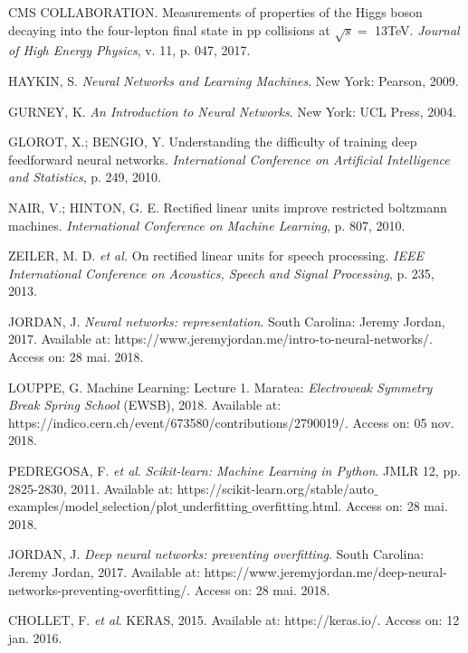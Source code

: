 \begin{thebibliography}{}
CMS COLLABORATION. Measurements of properties of the Higgs boson decaying into the four-lepton final state in pp collisions at $\sqrt{s}=$ 13TeV. \textit{Journal of High Energy Physics}, v. 11, p. 047, 2017.

HAYKIN, S. \textit{Neural Networks and Learning Machines}. New York: Pearson, 2009.

GURNEY, K. \textit{An Introduction to Neural Networks}. New York: UCL Press, 2004.

GLOROT, X.; BENGIO, Y. Understanding  the  difficulty  of training deep feedforward neural networks. \textit{International Conference  on  Artificial Intelligence  and  Statistics}, p. 249, 2010.

NAIR, V.; HINTON, G. E. Rectified  linear  units  improve restricted  boltzmann machines. \textit{International Conference on Machine Learning}, p. 807, 2010.

ZEILER, M. D. \textit{et al.} On rectified linear units for speech processing. \textit{IEEE International Conference on Acoustics, Speech and Signal Processing}, p. 235, 2013.

JORDAN, J. \textit{Neural networks: representation}. South Carolina: Jeremy Jordan, 2017. Available at: https://www.jeremyjordan.me/intro-to-neural-networks/. Access on: 28 mai. 2018.

LOUPPE, G. Machine Learning: Lecture 1. Maratea: \textit{Electroweak Symmetry Break Spring School} (EWSB), 2018. Available at: https://indico.cern.ch/event/673580/contributions/2790019/. Access on: 05 nov. 2018.

PEDREGOSA, F. \textit{et al}. \textit{Scikit-learn: Machine Learning in Python}. JMLR 12, pp. 2825-2830, 2011. Available at: https://scikit-learn.org/stable/auto$\_$examples/model$\_$selection/plot$\_$underfitting$\_$overfitting.html. Access on: 28 mai. 2018.

JORDAN, J. \textit{Deep neural networks: preventing overfitting}. South Carolina: Jeremy Jordan, 2017. Available at: https://www.jeremyjordan.me/deep-neural-networks-preventing-overfitting/. Access on: 28 mai. 2018.

CHOLLET, F. \textit{et al}. KERAS, 2015. Available at: https://keras.io/. Access on: 12 jan. 2016.


\end{thebibliography}
